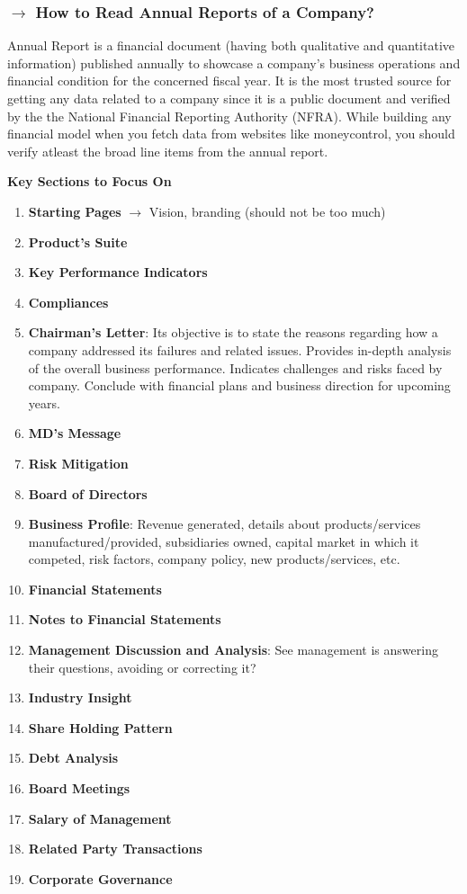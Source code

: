 \documentclass[12pt]{article}
\begin{document}
\subsubsection*{$\rightarrow$ How to Read Annual Reports of a Company?}

Annual Report is a financial document (having both qualitative and quantitative information) published annually to showcase a company's business operations and financial condition for the concerned fiscal year. It is the most trusted source for getting any data related to a company since it is a public document and verified by the the National Financial Reporting Authority (NFRA). While building any financial model when you fetch data from websites like moneycontrol, you should verify atleast the broad line items from the annual report.

\textbf{Key Sections to Focus On}

\begin{enumerate}
    \item \textbf{Starting Pages} $\rightarrow$ Vision, branding (should not be too much)
    \item \textbf{Product's Suite}
    \item \textbf{Key Performance Indicators}
    \item \textbf{Compliances}
    \item \textbf{Chairman's Letter}: Its objective is to state the reasons regarding how a company addressed its failures and related issues. Provides in-depth analysis of the overall business performance. Indicates challenges and risks faced by company. Conclude with financial plans and business direction for upcoming years.
    \item \textbf{MD's Message}
    \item \textbf{Risk Mitigation}
    \item \textbf{Board of Directors}
    \item \textbf{Business Profile}: Revenue generated, details about products/services manufactured/provided, subsidiaries owned, capital market in which it competed, risk factors, company policy, new products/services, etc.
    \item \textbf{Financial Statements}
    \item \textbf{Notes to Financial Statements}
    \item \textbf{Management Discussion and Analysis}: See management is answering their questions, avoiding or correcting it?
    \item \textbf{Industry Insight}
    \item \textbf{Share Holding Pattern}
    \item \textbf{Debt Analysis}
    \item \textbf{Board Meetings}
    \item \textbf{Salary of Management}
    \item \textbf{Related Party Transactions}
    \item \textbf{Corporate Governance}
\end{enumerate}
\end{document}
